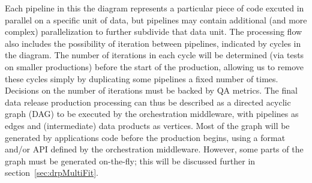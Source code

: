 Each pipeline in this the diagram represents a particular piece of code excuted in parallel on a specific unit of data, but pipelines may contain additional (and more complex) parallelization to further subdivide that data unit.  The processing flow also includes the possibility of iteration between pipelines, indicated by cycles in the diagram.  The number of iterations in each cycle will be determined (via tests on smaller productions) before the start of the production, allowing us to remove these cycles simply by duplicating some pipelines a fixed number of times.  Decisions on the number of iterations must be backed by QA metrics.  The final data release production processing can thus be described as a directed acyclic graph (DAG) to be executed by the orchestration middleware, with pipelines as edges and (intermediate) data products as vertices.  Most of the graph will be generated by applications code before the production begins, using a format and/or API defined by the orchestration middleware.  However, some parts of the graph must be generated on-the-fly; this will be discussed further in section~\ref{sec:drpMultiFit}.


